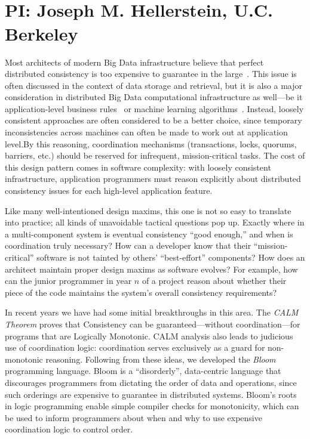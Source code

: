 \vspace{-2pt}
\section*{\mytitle\\
{\normalsize PI: Joseph M. Hellerstein, U.C. Berkeley}}
Most architects of modern Big Data infrastructure believe that perfect distributed consistency is too expensive to guarantee in the large~\cite{ladisreport}.  This issue is often discussed in the context of data storage and retrieval, but it is also a major consideration in distributed Big Data computational infrastructure as well---be it application-level business rules~\cite{finkelstein2011} or machine learning algorithms~\cite{hogwild}.  Instead, loosely consistent approaches are often considered to be a better choice, since temporary inconsistencies across machines can often be made to work out at application level.By this reasoning, coordination mechanisms (transactions, locks, quorums, barriers, etc.) should be reserved for infrequent, mission-critical tasks.  The cost of this design pattern comes in software complexity: with loosely consistent infrastructure, application programmers must reason explicitly about distributed consistency issues for each high-level application feature.

Like many well-intentioned design maxims, this one is not so easy to translate into practice; all kinds of unavoidable tactical questions pop up.  Exactly where in a multi-component system is eventual consistency ``good enough,'' and when is coordination truly necessary?  How can a developer know that their ``mission-critical'' software is not tainted by others' ``best-effort'' components?  How does an architect maintain proper design maxims as software evolves? For example, how can the junior programmer in year $n$ of a project reason about whether their piece of the code maintains the system's overall consistency requirements?

In recent years we have had some initial breakthroughs in this area.  The \emph{CALM Theorem} proves that Consistency can be guaranteed---without coordination---for programs that are Logically Monotonic. CALM analysis also leads to judicious use of coordination logic: coordination serves exclusively as a guard for non-monotonic reasoning.  Following from these ideas, we developed the \emph{Bloom} programming language.  Bloom is a ``disorderly'', data-centric language that discourages programmers from dictating the order of data and operations, since such orderings are expensive to guarantee in distributed systems.  Bloom's roots in logic programming enable simple compiler checks for monotonicity, which can be used to inform programmers about when and why to use expensive coordination logic to control order.


